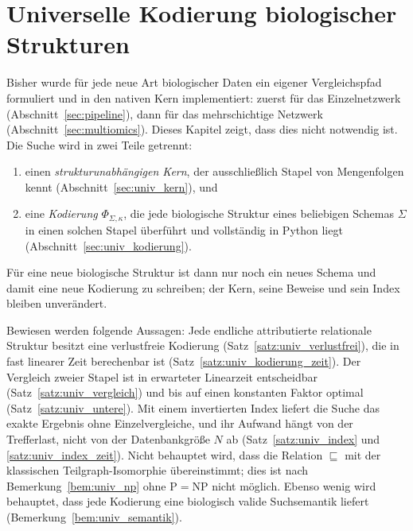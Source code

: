\documentclass[a4paper,12pt, twoside]{report}
\theoremstyle{definition}
\begin{document}
\chapter{Universelle Kodierung biologischer Strukturen}
\label{sec:universell}

Bisher wurde für jede neue Art biologischer Daten ein eigener Vergleichspfad formuliert und in den nativen Kern implementiert: zuerst für das Einzelnetzwerk (Abschnitt~\ref{sec:pipeline}), dann für das mehrschichtige Netzwerk (Abschnitt~\ref{sec:multiomics}). Dieses Kapitel zeigt, dass dies nicht notwendig ist. Die Suche wird in zwei Teile getrennt:
\begin{enumerate}[label=(\roman*)]
\item einen \emph{strukturunabhängigen Kern}, der ausschließlich Stapel von Mengenfolgen kennt (Abschnitt~\ref{sec:univ_kern}), und
\item eine \emph{Kodierung} $\Phi_{\Sigma,\kappa}$, die jede biologische Struktur eines beliebigen Schemas $\Sigma$ in einen solchen Stapel überführt und vollständig in Python liegt (Abschnitt~\ref{sec:univ_kodierung}).
\end{enumerate}
Für eine neue biologische Struktur ist dann nur noch ein neues Schema und damit eine neue Kodierung zu schreiben; der Kern, seine Beweise und sein Index bleiben unverändert.

Bewiesen werden folgende Aussagen: Jede endliche attributierte relationale Struktur besitzt eine verlustfreie Kodierung (Satz~\ref{satz:univ_verlustfrei}), die in fast linearer Zeit berechenbar ist (Satz~\ref{satz:univ_kodierung_zeit}). Der Vergleich zweier Stapel ist in erwarteter Linearzeit entscheidbar (Satz~\ref{satz:univ_vergleich}) und bis auf einen konstanten Faktor optimal (Satz~\ref{satz:univ_untere}). Mit einem invertierten Index liefert die Suche das exakte Ergebnis ohne Einzelvergleiche, und ihr Aufwand hängt von der Trefferlast, nicht von der Datenbankgröße $N$ ab (Satz~\ref{satz:univ_index} und \ref{satz:univ_index_zeit}). Nicht behauptet wird, dass die Relation $\sqsubseteq$ mit der klassischen Teilgraph-Isomorphie übereinstimmt; dies ist nach Bemerkung~\ref{bem:univ_np} ohne $\mathrm{P}=\mathrm{NP}$ nicht möglich. Ebenso wenig wird behauptet, dass jede Kodierung eine biologisch valide Suchsemantik liefert (Bemerkung~\ref{bem:univ_semantik}).
\end{document}
